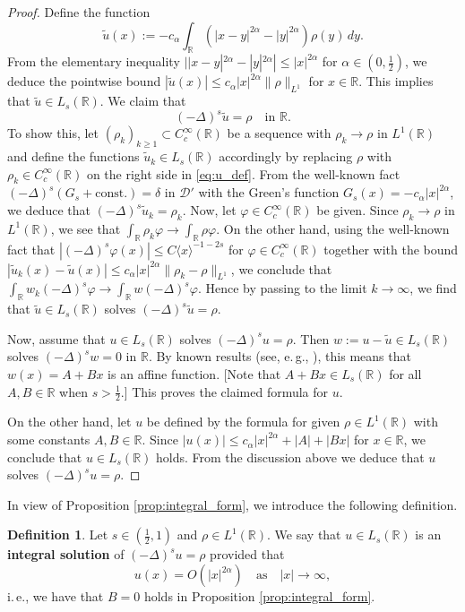 \documentclass[reqno,10pt,a4paper]{amsart}
\theoremstyle{definition}
\theoremstyle{definition}
\newtheorem*{definition*}{Definition}
\theoremstyle{remark}
\theoremstyle{remark}
\numberwithin{equation}{section}
\newcommand{\R}{\mathbb{R}}
\newcommand{\be}{\begin{equation}}
\newcommand{\ee}{\end{equation}}
\newcommand{\Ds}{(-\Delta)^{s}}
\renewcommand{\phi}{\varphi}
\begin{document}
\begin{proof}
Define the function
\be \label{eq:u_def}
\tilde{u}(x) := -c_\alpha \int_\R \left ( |x-y|^{2 \alpha} - |y|^{2 \alpha} \right ) \rho(y) \, dy .
\ee
From the elementary inequality $||x-y|^{2 \alpha} - |y|^{2 \alpha}| \leq |x|^{2 \alpha}$ for $\alpha \in (0, \frac{1}{2})$, we deduce the pointwise bound $|\tilde{u}(x)| \leq c_\alpha |x|^{2 \alpha} \| \rho \|_{L^1}$ for $x \in \R$. This implies that $\tilde{u} \in L_s(\R)$. We claim that
$$
\Ds \tilde{u} = \rho \quad \mbox{in $\R$}.
$$
To show this, let $(\rho_k)_{k \geq 1} \subset C^\infty_c(\R)$ be a sequence with $\rho_k \to \rho$ in $L^1(\R)$ and define the functions $\tilde{u}_k \in L_s(\R)$ accordingly by replacing $\rho$ with $\rho_k \in C^\infty_c(\R)$ on the right side in \eqref{eq:u_def}. From the well-known fact $\Ds (G_s +\mbox{const.})= \delta$ in $\mathcal{D}'$ with the Green's function $G_s(x) = -c_\alpha |x|^{2\alpha}$, we deduce that $\Ds \tilde{u}_k = \rho_k$. Now, let $\phi \in C^\infty_c(\R)$ be given. Since $\rho_k \to \rho$ in $L^1(\R)$, we see that $\int_{\R} \rho_k \phi \to \int_{\R} \rho \phi$. On the other hand, using the well-known fact that $|\Ds \phi(x)| \leq C \langle x \rangle^{-1-2s}$ for $\phi \in C^\infty_c(\R)$ together with the bound $|\tilde{u}_k(x) - \tilde{u}(x)| \leq c_\alpha |x|^{2\alpha} \| \rho_k - \rho \|_{L^1}$, we conclude that $\int_\R w_k \Ds \phi \to \int_\R w \Ds \phi$. Hence by passing to the limit $k \to \infty$, we find that $\tilde{u} \in L_s(\R)$ solves $\Ds \tilde{u} = \rho$.

Now, assume that $u \in L_s(\R)$ solves $\Ds u = \rho$. Then $w:= u -\tilde{u} \in L_s(\R)$ solves $\Ds w = 0$ in $\R$. By known results (see, e.\,g., \cite{Fa-16}), this means that $w(x) = A + B x$ is an affine function. [Note that $A+Bx \in L_s(\R)$ for all $A, B \in \R$ when $s > \frac{1}{2}$.] This proves the claimed formula for $u$.

On the other hand, let $u$ be defined by the formula for given $\rho \in L^1(\R)$ with some constants $A,B \in \R$. Since $|u(x)| \leq c_\alpha |x|^{2 \alpha} +|A| + |Bx|$ for $x \in \R$, we conclude that $u \in L_s(\R)$ holds. From the discussion above we deduce that $u$ solves $\Ds u = \rho$.
\end{proof}

In view of Proposition \ref{prop:integral_form}, we introduce the following definition.

\begin{definition*}
Let $s \in (\frac{1}{2},1)$ and $\rho \in L^1(\R)$. We say that $u \in L_s(\R)$ is an \textbf{integral solution} of $\Ds u = \rho$ provided that
$$
u(x) = O(|x|^{2 \alpha}) \quad \mbox{as} \quad |x| \to \infty,
$$ 
i.\,e., we have that $B=0$ holds in Proposition \ref{prop:integral_form}. 

\end{definition*}
\end{document}
